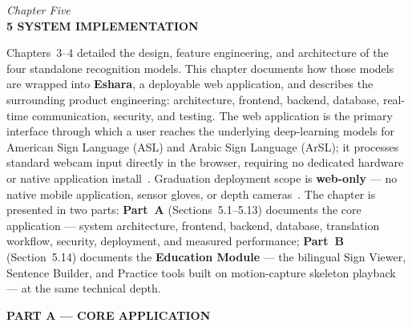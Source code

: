\newpage
\thispagestyle{plain}

\begin{center}
    \vspace*{0.5cm}
    {\large \textit{Chapter Five}} \\[0.4cm]
    {\Large \textbf{5 \quad SYSTEM IMPLEMENTATION}}
\end{center}
\vspace{0.45in}

\normalsize
{}

\newcommand{\imgplaceholder}[2]{%
  \fbox{\parbox[c][#1][c]{0.92\textwidth}{\centering
    \textbf{[INSERT IMAGE]}\\[4pt] \small #2}}}

\noindent Chapters~3--4 detailed the design, feature engineering, and architecture of the four standalone recognition models. This chapter documents how those models are wrapped into \textbf{Eshara}, a deployable web application, and describes the surrounding product engineering: architecture, frontend, backend, database, real-time communication, security, and testing. The web application is the primary interface through which a user reaches the underlying deep-learning models for American Sign Language (ASL) and Arabic Sign Language (ArSL); it processes standard webcam input directly in the browser, requiring no dedicated hardware or native application install~\cite{fastapi,react,vite2024}. Graduation deployment scope is \textbf{web-only} --- no native mobile application, sensor gloves, or depth cameras~\cite{typescript2024}. The chapter is presented in two parts: \textbf{Part~A} (Sections~5.1--5.13) documents the core application --- system architecture, frontend, backend, database, translation workflow, security, deployment, and measured performance; \textbf{Part~B} (Section~5.14) documents the \textbf{Education Module} --- the bilingual Sign Viewer, Sentence Builder, and Practice tools built on motion-capture skeleton playback --- at the same technical depth.\par\vspace{0.3cm}

\begin{center}{\large \textbf{PART A --- CORE APPLICATION}}\end{center}
\vspace{0.1cm}

